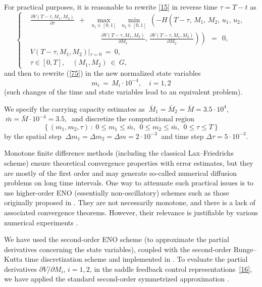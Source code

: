 \documentclass[11pt]{amsart}
\begin{document}
For practical purposes, it is reasonable to rewrite \cref{15} in reverse
time $ \tau = T - t $ as
\begin{equation}
\left\{ \begin{aligned}
& \frac{\partial V(T - \tau, M_1, M_2)}{\partial \tau} \:\: + \:\:
\max_{u_1 \in [0, 1]} \: \min_{u_2 \in [0, 1]} \:
\left( -H \left( T - \tau, \, M_1, \, M_2, \, u_1, \, u_2, 
{}^{{}^{{}^{{}^{{}^{}}}}} \right. \right. \\
& \qquad\qquad\qquad\qquad\qquad
\left. \left. \frac{\partial V(T - \tau, M_1, M_2)}{\partial M_1}, \,
\frac{\partial V(T - \tau, M_1, M_2)}{\partial M_2} \right) \right) \:\: =
\:\: 0, \\
& V(T - \tau, M_1, M_2) \left|_{\tau = 0} \right. \: = \: 0, \\
& \tau \in [0, T], \quad (M_1, M_2) \: \in \: G,
\end{aligned} \right.  \label{75}
\end{equation}
and then to rewrite (\ref{75}) in the new normalized state variables
\begin{equation}
m_i \, = \, M_i \cdot 10^{-4}, \quad i = 1,2  \label{75_1}
\end{equation}
(such changes of the time and state variables lead to an equivalent problem).

We specify the carrying capacity estimates as $ \: \bar{M}_1 = \bar{M}_2 =
\bar{M} = 3.5 \cdot 10^4 $,
$ \: \bar{m} = \bar{M} \cdot 10^{-4} = 3.5, \: $ and discretize the
computational region
$$
\left\{ (m_1, m_2, \tau) \: \colon \: 0 \leqslant m_1 \leqslant \bar{m}, \:\: 0
\leqslant m_2 \leqslant \bar{m}, \:\:
0 \leqslant \tau \leqslant T \right\}
$$
by the spatial step $ \: \Delta m_1 = \Delta m_2 = \Delta m = 2 \cdot 10^{-3}
\: $ and time step $ \Delta \tau = 5 \cdot 10^{-3} $.

Monotone finite difference methods (including the classical Lax--Friedrichs
scheme) ensure theoretical convergence properties with error estimates, but
they are mostly of the first order and may generate so-called numerical
diffusion problems on long time intervals. One way to attenuate such practical
issues is to use higher-order ENO (essentially non-oscillatory) schemes such
as those originally proposed in \cite{OsherShu1991}. They are not necessarily
monotone, and there is a lack of associated convergence theorems. However,
their relevance is justifiable by various numerical experiments 
\cite{OsherShu1991,BokanForcadelZidani2010}.

We have used the second-order ENO scheme (to approximate the partial
derivatives concerning the state variables), coupled with the second-order
Runge--Kutta time discretization scheme and implemented in \cite{ROCHJ2019}.
To evaluate the partial derivatives $ \partial V / \partial M_i $, $ i = 1,2 $,
in the saddle feedback control representations~\cref{16}, we have applied the
standard second-order symmetrized approximation
\cite[\S 5.7]{PressTeukolskyVetterlingFlannery2007}.
\end{document}
